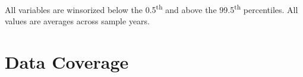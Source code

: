 \documentclass[12pt,notitlepage]{article}
\begin{document}
\begin{table}[!htpb]
\caption{Unweighted French Summary Statistics}
 \\
All variables are winsorized below the 0.5\textsuperscript{th} and above the 99.5\textsuperscript{th} percentiles. All values are averages across sample years.
\end{table}



\FloatBarrier
\section{Data Coverage} %
\label{sec:Data_Coverage}
\FloatBarrier

\begin{table}[!htpb]
\caption{Number of Firms: Orbis (OB) vs. EuroStat (ES)}
\tabularnewline \\

\end{table}
\end{document}
